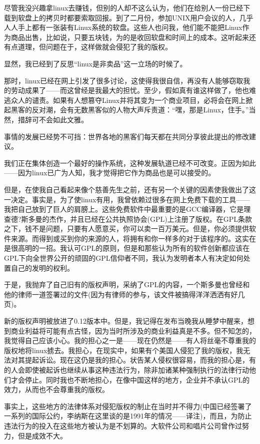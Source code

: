 尽管我没兴趣拿linux去赚钱，但别的人却不这么认为，他们在给别人一份已经下载到软盘上的拷贝时都要索取回报。到了二月份，参加UNIX用户会议的人，几乎人人手上都有一张装有Linux系统的软盘。这些人也问我，他们能不能把Linux作为商品出售，比如说，只要五块钱，为的是收回软盘和时间上的成本。这听起来还有点道理，但问题在于，这样做就会侵犯了我的版权。

显然，我已经到了反思“linux是非卖品”这一立场的时候了。

那时，linux已经在网上引发了很多讨论，这使得我很自信，再没有人能够窃取我的劳动成果了——而这曾经是我最大的担忧。至少，假如真有谁这样做了，他也难逃众人的谴责。如果有人想篡夺Linux并将其变为一个商业项目，必将会在网上掀起黑客的反对潮，会有无数黑客似的人物大声斥责道：“嘿，那是Linux，住手。”当然，措辞可不会如此文雅。

事情的发展已经势不可挡：世界各地的黑客们每天都在共同分享彼此提出的修改建议。

我们正在集体创造一个最好的操作系统，这种发展轨道已经不可改变。正因为如此——因为linux已广为人知，我才觉得把它作为商品也是可以接受的。

但是，在使我自己看起来像个慈善先生之前，还有另一个关键的因素使我做出了这一决定。事实是，为了使linux有用，我曾依赖过很多在网上免费下载的工具——我把自己放到了巨人的肩膀上。这些免费软件中最重要的是GCC编译器，它是理查德?斯多曼的杰作，并且已经在公共执照协会(GPL)上注册了版权。在GPL条款之下，钱不是问题，只要有人愿意买，你可以卖一百万美元。但是，你必须提供软件来源。而得到或买到你的来源的人，将拥有和你一样多的对于该程序的。这实在是很高明的一招。我认可GPL的原则，但是和那些认为所有的软件创新都应该在GPL下向全世界公开的顽固的GPL信仰者不同，我认为发明者本人有决定如何处置自己的发明的权利。

于是，我抛弃了自己旧有的版权声明，采纳了GPL的内容，一个斯多曼也曾经和他的律师一道签署过的文件(因为有律师的参与，该文件被搞得洋洋洒洒有好几页)。

新的版权声明被放进了0.12版本中。但是，我记得在发布当晚我从睡梦中醒来，想到商业利益将可能有点古怪，因为当时所涉及的商业利益真是不多。但不知怎的，我觉得自己应该小心。我的担心之一是——现在仍然是——有人将丝毫不尊重我的版权地将linux掳去。我担心，在现实中，如果有个美国人侵犯了我的版权，我无法对其提起诉讼。现在这仍是我的担心。状告某人侵权很容易，而我的担心是，有的人会即使被起诉也继续从事这种违法行为，除非加诸某种强制执行的法律行动他们才会停止。同时我也不断地担心，在像中国这样的地方，企业并不承认GPL的效力，从而也不会尊重我的版权。

事实上，这些地方的法律体系对侵犯版权的制止在当时并不得力(中国已经签署了一系列的国际公约，李纳斯在这里谈的是1991年的情况——译注)，而且，为防止违法行为的投入在这些地方被认为是不划算的。大软件公司和唱片公司曾作过努力，但是成效不大。

